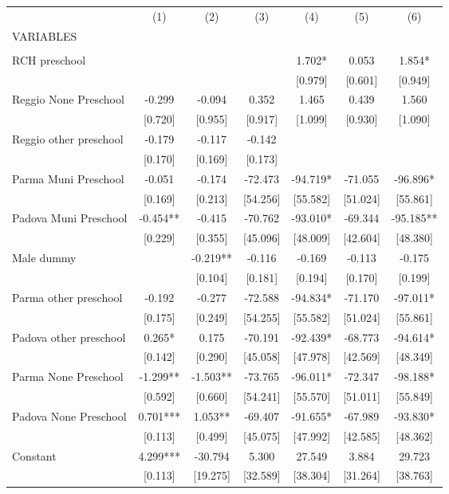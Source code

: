 \begin{tabular}{lcccccc} \hline
 & (1) & (2) & (3) & (4) & (5) & (6) \\
VARIABLES &  &  &  &  &  &  \\ \hline
 &  &  &  &  &  &  \\
RCH preschool &  &  &  & 1.702* & 0.053 & 1.854* \\
 &  &  &  & [0.979] & [0.601] & [0.949] \\
Reggio None Preschool & -0.299 & -0.094 & 0.352 & 1.465 & 0.439 & 1.560 \\
 & [0.720] & [0.955] & [0.917] & [1.099] & [0.930] & [1.090] \\
Reggio other preschool & -0.179 & -0.117 & -0.142 &  &  &  \\
 & [0.170] & [0.169] & [0.173] &  &  &  \\
Parma Muni Preschool & -0.051 & -0.174 & -72.473 & -94.719* & -71.055 & -96.896* \\
 & [0.169] & [0.213] & [54.256] & [55.582] & [51.024] & [55.861] \\
Padova Muni Preschool & -0.454** & -0.415 & -70.762 & -93.010* & -69.344 & -95.185** \\
 & [0.229] & [0.355] & [45.096] & [48.009] & [42.604] & [48.380] \\
Male dummy &  & -0.219** & -0.116 & -0.169 & -0.113 & -0.175 \\
 &  & [0.104] & [0.181] & [0.194] & [0.170] & [0.199] \\
Parma other preschool & -0.192 & -0.277 & -72.588 & -94.834* & -71.170 & -97.011* \\
 & [0.175] & [0.249] & [54.255] & [55.582] & [51.024] & [55.861] \\
Padova other preschool & 0.265* & 0.175 & -70.191 & -92.439* & -68.773 & -94.614* \\
 & [0.142] & [0.290] & [45.058] & [47.978] & [42.569] & [48.349] \\
Parma None Preschool & -1.299** & -1.503** & -73.765 & -96.011* & -72.347 & -98.188* \\
 & [0.592] & [0.660] & [54.241] & [55.570] & [51.011] & [55.849] \\
Padova None Preschool & 0.701*** & 1.053** & -69.407 & -91.655* & -67.989 & -93.830* \\
 & [0.113] & [0.499] & [45.075] & [47.992] & [42.585] & [48.362] \\
Constant & 4.299*** & -30.794 & 5.300 & 27.549 & 3.884 & 29.723 \\
 & [0.113] & [19.275] & [32.589] & [38.304] & [31.264] & [38.763] \\

\end{tabular}
